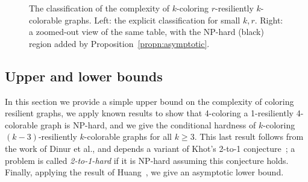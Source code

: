 \documentclass{llncs}
\begin{document}
\begin{figure}
\centering
\begin{subfigure}{.65\textwidth}
  \centering
\end{subfigure}%
\begin{subfigure}{.35\textwidth}
  \centering
\end{subfigure}
\caption{The  classification of the complexity of $k$-coloring
$r$-resiliently $k$-colorable graphs. Left: the explicit classification for
small $k, r$. Right: a zoomed-out view of the same table, with the 
NP-hard (black) region added by Proposition~\ref{propn:asymptotic}.}
\label{fig:classification} \end{figure}

\subsection{Upper and lower bounds} \label{sec:easy-bounds}
In this section we provide a simple upper bound on the complexity of coloring
resilient graphs, we apply known results to show that 4-coloring a
1-resiliently 4-colorable graph is NP-hard, and we give the conditional
hardness of $k$-coloring $(k-3)$-resiliently $k$-colorable graphs for all $k
\geq 3$.  This last result follows from the work of Dinur et al., and depends a
variant of Khot's 2-to-1 conjecture~\cite{DMR06}; a problem is called
\emph{2-to-1-hard} if it is NP-hard assuming this conjecture holds. Finally,
applying the result of Huang~\cite{Huang13}, we give an asymptotic lower bound. 
\end{document}
